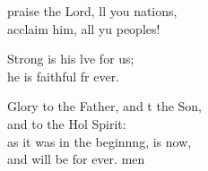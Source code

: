 \settowidth{\versewidth}{Glory to the Father, and to the Son, *}
\begin{psalmverse}%
  \begin{patverse}
     praise the Lord, ll you nations,\Med\\
acclaim him, all yu peoples!

Strong is his lve for us;\Med\\
he is faithful fr ever.

Glory to the Father, and t the Son,\Med\\
and to the Hol Spirit:\\
as it was in the beginn\pointup{\i}ng, is now,\Med\\
and will be for ever. men
  \end{patverse}
\end{psalmverse}
